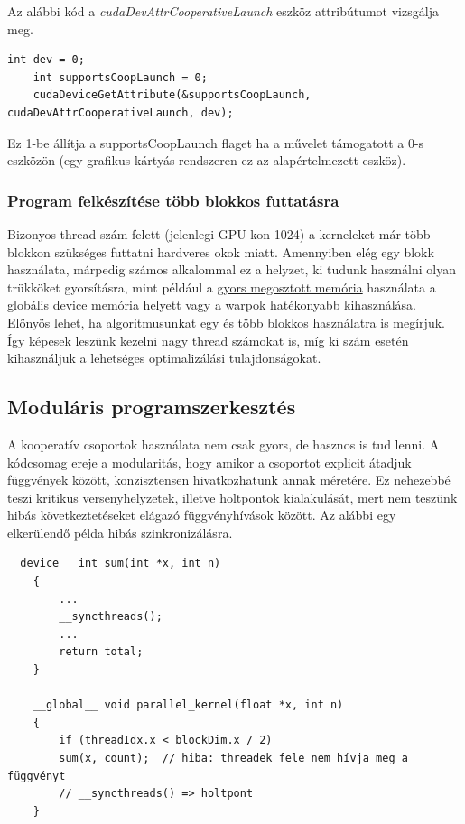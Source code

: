 Az alábbi kód a \textit{cudaDevAttrCooperativeLaunch} eszköz attribútumot vizsgálja meg.
\begin{lstlisting}[style=CStyle]
	int dev = 0;
	int supportsCoopLaunch = 0;
	cudaDeviceGetAttribute(&supportsCoopLaunch, cudaDevAttrCooperativeLaunch, dev);
\end{lstlisting}

Ez 1-be állítja a supportsCoopLaunch flaget ha a művelet támogatott a 0-s eszközön (egy grafikus kártyás rendszeren ez az alapértelmezett eszköz).

\subsubsection{Program felkészítése több blokkos futtatásra}
Bizonyos thread szám felett (jelenlegi GPU-kon 1024) a kerneleket már több blokkon szükséges futtatni hardveres okok miatt. Amennyiben elég egy blokk használata, márpedig számos alkalommal ez a helyzet, ki tudunk használni olyan trükköket gyorsításra, mint például a \href{https://docs.nvidia.com/cuda/cuda-c-programming-guide/index.html#shared-memory}{gyors megosztott memória} használata a globális device memória helyett vagy a warpok hatékonyabb kihasználása. Előnyös lehet, ha algoritmusunkat egy és több blokkos használatra is megírjuk. Így képesek leszünk kezelni nagy thread számokat is, míg ki szám esetén kihasználjuk a lehetséges optimalizálási tulajdonságokat.

\subsection{Moduláris programszerkesztés}
A kooperatív csoportok használata nem csak gyors, de hasznos is tud lenni. A kódcsomag ereje a modularitás, hogy amikor a csoportot explicit átadjuk függvények között, konzisztensen hivatkozhatunk annak méretére. Ez nehezebbé teszi kritikus versenyhelyzetek, illetve holtpontok kialakulását, mert nem teszünk hibás következtetéseket elágazó függvényhívások között. Az alábbi egy elkerülendő példa hibás szinkronizálásra.
\begin{lstlisting}[style=CStyle]
	__device__ int sum(int *x, int n) 
	{
		...
		__syncthreads();
		...
		return total;
	}
	
	__global__ void parallel_kernel(float *x, int n)
	{
		if (threadIdx.x < blockDim.x / 2)
		sum(x, count);  // hiba: threadek fele nem hívja meg a függvényt
		// __syncthreads() => holtpont
	}
\end{lstlisting}

